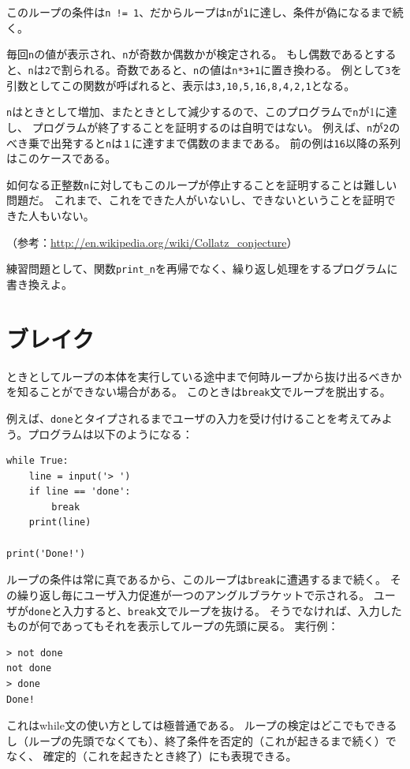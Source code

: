 \documentclass[a4j,12pt,makeidx]{jbook}
\begin{document}
このループの条件は{\tt n != 1}、だからループは{\tt n}が{\tt 1}に達し、条件が偽になるまで続く。\par
毎回{\tt n}の値が表示され、{\tt n}が奇数か偶数かが検定される。
もし偶数であるとすると、{\tt n}は{\tt 2}で割られる。奇数であると、{\tt n}の値は{\tt n*3+1}に置き換わる。
例として{\tt 3}を引数としてこの関数が呼ばれると、表示は{\tt 3,10,5,16,8,4,2,1}となる。\par
{\tt n}はときとして増加、またときとして減少するので、このプログラムで{\tt n}が1に達し、
プログラムが終了することを証明するのは自明ではない。
例えば、{\tt n}が{\tt 2}のべき乗で出発すると{\tt n}は{\tt １}に達すまで偶数のままである。
前の例は{\tt 16}以降の系列はこのケースである。\par
如何なる正整数{\tt n}に対してもこのループが停止することを証明することは難しい問題だ。
これまで、これをできた人がいないし、できないということを証明できた人もいない。 \par
（参考：\url{http://en.wikipedia.org/wiki/Collatz_conjecture}） \par
練習問題として、関数{\tt print\_n}を再帰でなく、繰り返し処理をするプログラムに書き換えよ。
%
\section{ブレイク}
 ときとしてループの本体を実行している途中まで何時ループから抜け出るべきかを知ることができない場合がある。
このときは{\tt break}文でループを脱出する。 \par
例えば、{\tt done}とタイプされるまでユーザの入力を受け付けることを考えてみよう。プログラムは以下のようになる：
\begin{verbatim}
while True:
    line = input('> ')
    if line == 'done':
        break
    print(line)

print('Done!')
\end{verbatim}
ループの条件は常に真であるから、このループは{\tt break}に遭遇するまで続く。
その繰り返し毎にユーザ入力促進が一つのアングルブラケットで示される。
ユーザが{\tt done}と入力すると、{\tt break}文でループを抜ける。
そうでなければ、入力したものが何であってもそれを表示してループの先頭に戻る。
実行例：
\begin{verbatim}
> not done
not done
> done
Done!
\end{verbatim}
これはwhile文の使い方としては極普通である。
ループの検定はどこでもできるし（ループの先頭でなくても）、終了条件を否定的（これが起きるまで続く）でなく、
確定的（これを起きたとき終了）にも表現できる。
%
\end{document}
